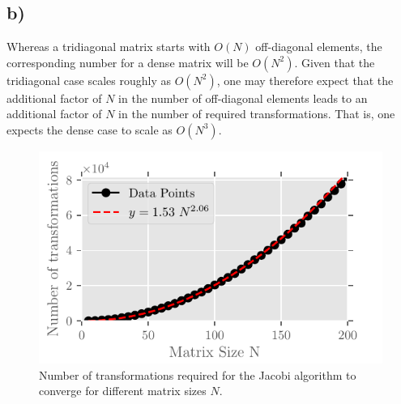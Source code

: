 \documentclass[english,notitlepage,reprint,nofootinbib]{revtex4-2}  %
\begin{document}
\subsection*{b)}
Whereas a tridiagonal matrix starts with \(O(N)\) off-diagonal elements, the corresponding number for a dense matrix will be \(O(N^2)\).
Given that the tridiagonal case scales roughly as \(O(N^2)\), one may therefore expect that the additional factor of \(N\) in the number of off-diagonal elements leads to an additional factor of \(N\) in the number of required transformations.
That is, one expects the dense case to scale as \(O(N^3)\).

\begin{figure}
    \centering
    \includegraphics{Code/output/iterations.pdf}
    \caption{Number of transformations required for the Jacobi algorithm to converge for different matrix sizes \(N\).}
    \label{fig:iterations}
\end{figure}
\end{document}
